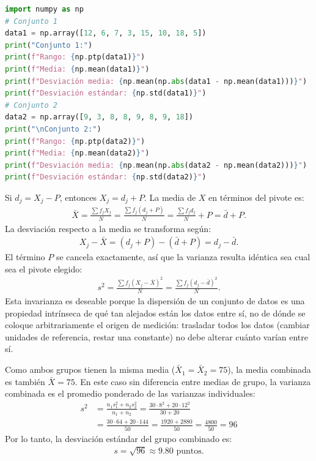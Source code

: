 \begin{lstlisting}[language=Python]
import numpy as np
# Conjunto 1
data1 = np.array([12, 6, 7, 3, 15, 10, 18, 5])
print("Conjunto 1:")
print(f"Rango: {np.ptp(data1)}")
print(f"Media: {np.mean(data1)}")
print(f"Desviación media: {np.mean(np.abs(data1 - np.mean(data1)))}")
print(f"Desviación estándar: {np.std(data1)}")
# Conjunto 2
data2 = np.array([9, 3, 8, 8, 9, 8, 9, 18])
print("\nConjunto 2:")
print(f"Rango: {np.ptp(data2)}")
print(f"Media: {np.mean(data2)}")
print(f"Desviación media: {np.mean(np.abs(data2 - np.mean(data2)))}")
print(f"Desviación estándar: {np.std(data2)}")
\end{lstlisting}

\begin{solproblema}[prob:c5833ad]
	Si $d_j = X_j - P$, entonces $X_j = d_j + P$. La media de $X$ en términos del pivote es:
	\begin{align}
		\bar{X} = \frac{\sum f_j X_j}{N} = \frac{\sum f_j (d_j + P)}{N} = \frac{\sum f_j d_j}{N} + P = \bar{d} + P.
	\end{align}
	La desviación respecto a la media se transforma según:
	\begin{align}
		X_j - \bar{X} = (d_j + P) - (\bar{d} + P) = d_j - \bar{d}.
	\end{align}
	El término $P$ se cancela exactamente, así que la varianza resulta idéntica sea cual sea el pivote elegido:
	\begin{align}
		s^2 = \frac{\sum f_j (X_j - \bar{X})^2}{N} = \frac{\sum f_j (d_j - \bar{d})^2}{N}.
	\end{align}
	Esta invarianza es deseable porque la dispersión de un conjunto de datos es una propiedad intrínseca de qué tan alejados están los datos entre sí, no de dónde se coloque arbitrariamente el origen de medición: trasladar todos los datos (cambiar unidades de referencia, restar una constante) no debe alterar cuánto varían entre sí.
\end{solproblema}

\begin{solproblema}[prob:d87f55c]
	Como ambos grupos tienen la misma media ($\bar{X}_1 = \bar{X}_2 = 75$), la media combinada es también $\bar{X} = 75$. En este caso sin diferencia entre medias de grupo, la varianza combinada es el promedio ponderado de las varianzas individuales:
	\begin{align}
		s^2 &= \frac{n_1 s_1^2 + n_2 s_2^2}{n_1 + n_2} = \frac{30 \cdot 8^2 + 20 \cdot 12^2}{30 + 20} \\
		&= \frac{30 \cdot 64 + 20 \cdot 144}{50} = \frac{1920 + 2880}{50} = \frac{4800}{50} = 96
	\end{align}
	Por lo tanto, la desviación estándar del grupo combinado es:
	\begin{align}
		s = \sqrt{96} \approx 9.80 \text{ puntos.}
	\end{align}
\end{solproblema}


